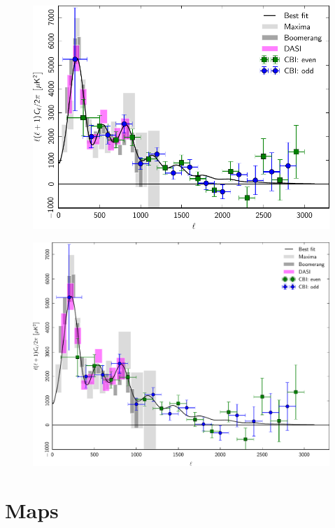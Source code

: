 \documentclass[traditabstract]{aa}
\begin{document}
\begin{figure}[ht]
\sidecaption
\includegraphics[width=12cm]{PlanckFig_lineplot_python_120mm.pdf}
\caption{\fcaption}
\end{figure}

\begin{figure}[t]
\includegraphics[width=18cm]{PlanckFig_lineplot_python_180mm.pdf}
\caption{\fcaption}
\end{figure}

\clearpage











\section{Maps}
\end{document}

